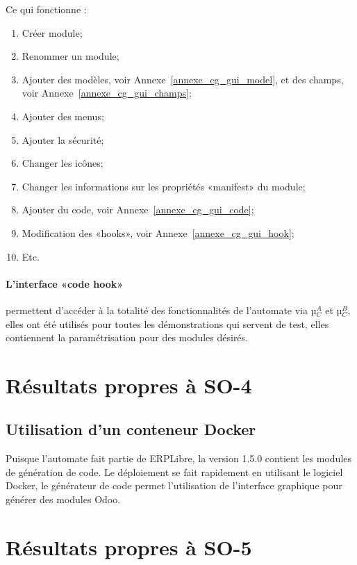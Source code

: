 Ce qui fonctionne : 
\begin{enumerate}
    \item Créer module;
    \item Renommer un module;
    \item Ajouter des modèles, voir Annexe~\ref{annexe_cg_gui_model}, et des champs, voir Annexe~\ref{annexe_cg_gui_champs};
    \item Ajouter des menus;
    \item Ajouter la sécurité;
    \item Changer les icônes;
    \item Changer les informations sur les propriétés «manifest» du module;
    \item Ajouter du code, voir Annexe~\ref{annexe_cg_gui_code};
    \item Modification des «hooks», voir Annexe~\ref{annexe_cg_gui_hook};
    \item Etc.
\end{enumerate}

\paragraph{L'interface «code hook»}


permettent d’accéder à la totalité des fonctionnalités de l’automate via µ$_C^A$ et µ$_C^B$, elles ont été utilisés pour toutes les démonstrations qui servent de test, elles contiennent la paramétrisation pour des modules désirés.

\section{Résultats propres à SO-4}

\subsection{Utilisation d’un conteneur Docker}

Puisque l’automate fait partie de ERPLibre, la version 1.5.0 contient les modules de génération de code. Le déploiement se fait rapidement en utilisant le logiciel Docker, le générateur de code permet l’utilisation de l’interface graphique pour générer des modules Odoo.

\section{Résultats propres à SO-5}

